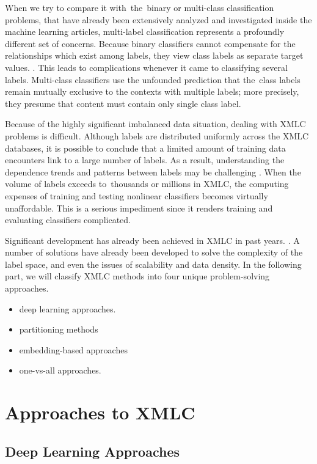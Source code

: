 \documentclass[a4paper]{article}
\begin{document}
When we try to compare it with the binary or multi-class classification problems, that have already been extensively analyzed and investigated inside the machine learning articles, multi-label classification represents a profoundly different set of concerns. Because binary classifiers cannot compensate for the relationships which exist among labels, they view class labels as separate target values. \cite{bib2}. This leads to complications whenever it came to classifying several labels. Multi-class classifiers use the unfounded prediction that the class labels remain mutually exclusive to the contexts with multiple labels; more precisely, they presume that content must contain only single class label.

Because of the highly significant imbalanced data situation, dealing with XMLC problems is difficult. Although labels are distributed uniformly across the XMLC databases, it is possible to conclude that a limited amount of training data encounters link to a large number of labels. As a result, understanding the dependence trends and patterns between labels may be challenging \cite{bib3}. When the volume of labels exceeds to thousands or millions in XMLC, the computing expenses of training and testing nonlinear classifiers becomes virtually unaffordable. This is a serious impediment since it renders training and evaluating classifiers complicated.

Significant development has already been achieved in XMLC in past years. \cite{bib4}. A number of solutions have already been developed to solve the complexity of the label space, and even the issues of scalability and data density. In the following part, we will classify XMLC methods into four unique problem-solving approaches.

\begin{itemize}
    \item deep learning approaches.
    \item partitioning methods
    \item embedding-based approaches
    \item one-vs-all approaches.
\end{itemize}

\section{Approaches to XMLC}
\subsection{Deep Learning Approaches}
\end{document}
